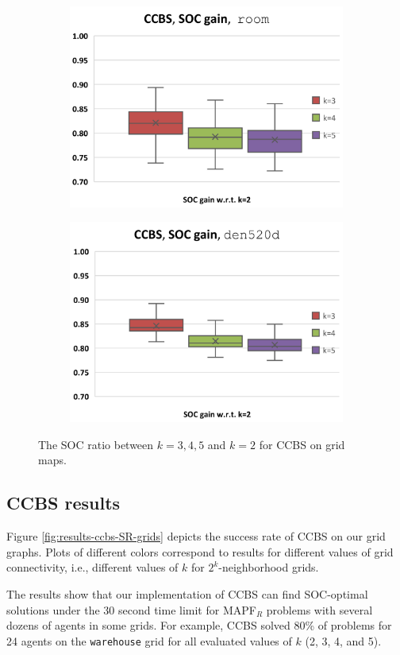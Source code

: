 \documentclass[review]{elsarticle}
\newcommand\konstantin[1]{\nb{\textbf{Konstantin:}}{red}{#1}}
\newcommand\roni[1]{\nb{\textbf{Roni:}}{green}{#1}}
\newcommand{\ccbs}{\ac{CCBS}\xspace}
\newcommand{\mapfr}{\ac{MAPF}$_R$\xspace}
\begin{document}
\begin{figure}[t]
    \begin{subfigure}
        \centering
        \includegraphics[width=0.45\linewidth]{mapfr-SOC-plot-ccbs-room.pdf}
    \end{subfigure}\hspace{0.025\linewidth}
    \begin{subfigure}
        \centering
        \includegraphics[width=0.45\linewidth]{mapfr-SOC-plot-ccbs-den520d.pdf}
    \end{subfigure}%
    
\caption{The SOC ratio between $k=3,4,5$ and $k=2$ for \ccbs on grid maps.}
\label{fig:results-ccbs-SOC-grids}
\end{figure}


\subsection{\ccbs results}

Figure \ref{fig:results-ccbs-SR-grids} depicts the success rate of \ccbs on our grid graphs. Plots of different colors correspond to results for different values of grid connectivity, i.e., different values of $k$ for $2^k$-neighborhood grids. 


The results show that our implementation of \ccbs can find SOC-optimal solutions under the 30 second time limit for \mapfr problems with several dozens of agents in some grids. 
For example, \ccbs solved 80\% of problems for 24 agents on the \texttt{warehouse} grid for all evaluated values of $k$ (2, 3, 4, and 5). %
\end{document}
